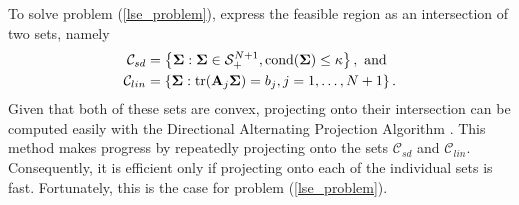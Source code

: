 \documentclass[11pt]{article}
\newcommand{\R}{\mathbb{R}}
\theoremstyle{definition}
\theoremstyle{definition}
\def\bSigma{{\bf \Sigma}}
\def\A{{\bf A}}
\def\M{{\bf M}}
\def\cond{\text{cond}}
\def\Tr{\text{tr}}
\begin{document}


To solve problem (\ref{lse_problem}), express the feasible region as an intersection of two sets, namely 
\begin{align*}
\mathcal{C}_{sd} &= \left\{\bSigma : \bSigma \in \mathcal{S}_{+}^{N+1}, \cond(\bSigma) \leq \kappa\right\}, \text{ and }\\
\mathcal{C}_{lin} &= \left\{\bSigma : \Tr(\A_j \bSigma) = b_j, j = 1, \dots, N+1\right\}.
\end{align*}
Given that both of these sets are convex, projecting onto their intersection can be computed easily with the Directional Alternating Projection Algorithm \citep{gubin1967method}. This method makes progress by repeatedly projecting onto the sets $\mathcal{C}_{sd}$ and $\mathcal{C}_{lin}$. Consequently, it is efficient only if projecting onto each of the individual sets is fast. Fortunately, this is the case for problem (\ref{lse_problem}). 


%
%






\end{document}
